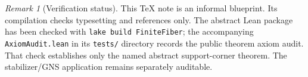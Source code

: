 \documentclass[11pt,reqno]{amsart}
\numberwithin{equation}{section}
\theoremstyle{definition}
\theoremstyle{remark}
\newtheorem{remark}[theorem]{Remark}
\begin{document}
\begin{remark}[Verification status]
\label{rem:verification_status}
This TeX note is an informal blueprint.  Its compilation checks typesetting
and references only.  The abstract Lean package has been checked with
\texttt{lake build FiniteFiber}; the accompanying
\texttt{AxiomAudit.lean} in its \texttt{tests/} directory records the public
theorem axiom audit.  That check establishes only the named abstract
support-corner theorem.  The stabilizer/GNS application remains separately
auditable.
\end{remark}
\end{document}

